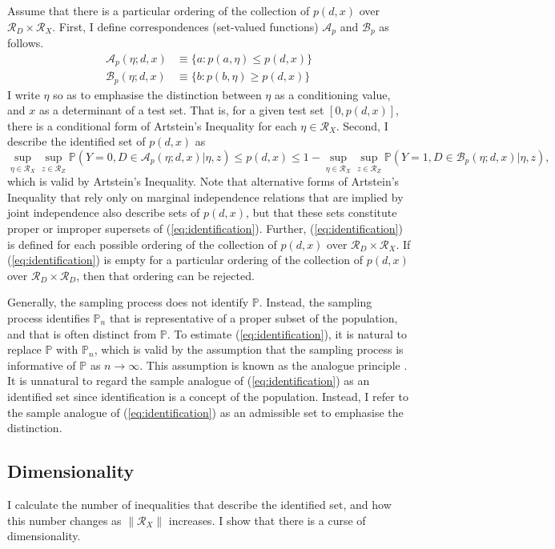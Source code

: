 \documentclass[12pt,a4paper,twoside]{article}
\numberwithin{equation}{section}
\newcommand{\Art}{Artstein's Inequality}
\begin{document}
Assume that there is a particular ordering of the collection of $p(d,x)$ over $\mathcal{R}_D\times\mathcal{R}_X$. First, I define correspondences (set-valued functions) $\mathcal{A}_p$ and $\mathcal{B}_p$ as follows.
\begin{align*}
\mathcal{A}_p(\eta;d,x)&\equiv\lbrace a : p(a,\eta)\leq p(d,x)\rbrace\\
\mathcal{B}_p(\eta;d,x)&\equiv\lbrace b : p(b,\eta)\geq p(d,x)\rbrace
\end{align*}
I write $\eta$ so as to emphasise the distinction between $\eta$ as a conditioning value, and $x$ as a determinant of a test set. That is, for a given test set $[0,p(d,x)]$, there is a conditional form of {\Art} for each $\eta\in\mathcal{R}_X$. Second, I describe the identified set of $p(d,x)$ as
\begin{equation}
\sup_{\eta\in\mathcal{R}_X}\sup_{z\in\mathcal{R}_Z}\mathbb{P}(Y=0,D\in\mathcal{A}_p(\eta;d,x)|\eta,z)\leq p(d,x)\leq 1-\sup_{\eta\in\mathcal{R}_X}\sup_{z\in\mathcal{R}_Z}\mathbb{P}(Y=1,D\in\mathcal{B}_p(\eta;d,x)|\eta,z),\label{eq:identification}
\end{equation}
which is valid by {\Art}. Note that alternative forms of {\Art} that rely only on marginal independence relations that are implied by joint independence also describe sets of $p(d,x)$, but that these sets constitute proper or improper supersets of (\ref{eq:identification}). Further, (\ref{eq:identification}) is defined for each possible ordering of the collection of $p(d,x)$ over $\mathcal{R}_D\times\mathcal{R}_X$. If (\ref{eq:identification}) is empty for a particular ordering of the collection of $p(d,x)$ over $\mathcal{R}_D\times\mathcal{R}_D$, then that ordering can be rejected. 

Generally, the sampling process does not identify $\mathbb{P}$. Instead, the sampling process identifies $\mathbb{P}_n$ that is representative of a proper subset of the population, and that is often distinct from $\mathbb{P}$. To estimate (\ref{eq:identification}), it is natural to replace $\mathbb{P}$ with $\mathbb{P}_n$, which is valid by the assumption that the sampling process is informative of $\mathbb{P}$ as $n\rightarrow\infty$. This assumption is known as the analogue principle \citep{book.analogue}. It is unnatural to regard the sample analogue of (\ref{eq:identification}) as an identified set since identification is a concept of the population. Instead, I refer to the sample analogue of (\ref{eq:identification}) as an admissible set to emphasise the distinction.   
\subsection{Dimensionality}
I calculate the number of inequalities that describe the identified set, and how this number changes as $\|\mathcal{R}_X\|$ increases. I show that there is a curse of dimensionality.
\end{document}
